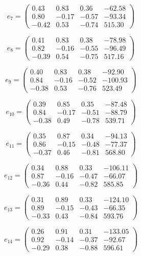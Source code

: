 \documentclass[a4paper,12pt]{article}
\begin{document}
{\[
e_7 = \begin{pmatrix}
0.43 & 0.83 & 0.36 & -62.58 \\
0.80 & -0.17 & -0.57 & -93.34 \\
-0.42 & 0.53 & -0.74 & 515.30
\end{pmatrix}
\]

\[
e_8 = \begin{pmatrix}
0.41 & 0.83 & 0.38 & -78.98 \\
0.82 & -0.16 & -0.55 & -96.49 \\
-0.39 & 0.54 & -0.75 & 517.16
\end{pmatrix}
\]

\[
e_9 = \begin{pmatrix}
0.40 & 0.83 & 0.38 & -92.90 \\
0.84 & -0.16 & -0.52 & -100.93 \\
-0.38 & 0.53 & -0.76 & 523.49
\end{pmatrix}
\]

\[
e_{10} = \begin{pmatrix}
0.39 & 0.85 & 0.35 & -87.48 \\
0.84 & -0.17 & -0.51 & -88.79 \\
-0.38 & 0.49 & -0.78 & 539.71
\end{pmatrix}
\]

\[
e_{11} = \begin{pmatrix}
0.35 & 0.87 & 0.34 & -94.13 \\
0.86 & -0.15 & -0.48 & -77.37 \\
-0.37 & 0.46 & -0.81 & 568.80
\end{pmatrix}
\]

\[
e_{12} = \begin{pmatrix}
0.34 & 0.88 & 0.33 & -106.11 \\
0.87 & -0.16 & -0.47 & -66.07 \\
-0.36 & 0.44 & -0.82 & 585.85
\end{pmatrix}
\]

\[
e_{13} = \begin{pmatrix}
0.31 & 0.89 & 0.33 & -124.10 \\
0.89 & -0.15 & -0.43 & -66.35 \\
-0.33 & 0.43 & -0.84 & 593.76
\end{pmatrix}
\]

\[
e_{14} = \begin{pmatrix}
0.26 & 0.91 & 0.31 & -133.05 \\
0.92 & -0.14 & -0.37 & -92.67 \\
-0.29 & 0.38 & -0.88 & 596.61
\end{pmatrix}
\]

}
\end{document}
